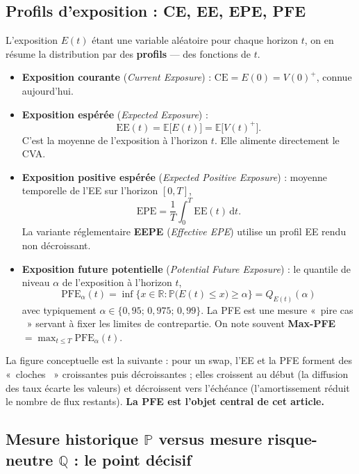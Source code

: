 \documentclass[11pt,a4paper]{article}
\providecommand{\og}{«~}
\providecommand{\fg}{~»}
\newcommand{\PFE}{\mathrm{PFE}}
\newcommand{\EE}{\mathrm{EE}}
\newcommand{\EPE}{\mathrm{EPE}}
\newcommand{\CE}{\mathrm{CE}}
\newcommand{\Prob}{\mathbb{P}}
\newcommand{\Qmeas}{\mathbb{Q}}
\newcommand{\E}{\mathbb{E}}
\newcommand{\R}{\mathbb{R}}
\newcommand{\dd}{\mathrm{d}}
\theoremstyle{remark}
\begin{document}
\subsection{Profils d'exposition : CE, EE, EPE, PFE}

L'exposition $E(t)$ étant une variable aléatoire pour chaque horizon $t$, on en résume la distribution par des \textbf{profils} --- des fonctions de $t$.
\begin{itemize}[nosep]
  \item \textbf{Exposition courante} (\emph{Current Exposure}) : $\CE = E(0) = V(0)^{+}$, connue aujourd'hui.
  \item \textbf{Exposition espérée} (\emph{Expected Exposure}) :
  \begin{equation}
  \EE(t) = \E\big[E(t)\big] = \E\big[V(t)^{+}\big].
  \end{equation}
  C'est la moyenne de l'exposition à l'horizon $t$. Elle alimente directement le CVA.
  \item \textbf{Exposition positive espérée} (\emph{Expected Positive Exposure}) : moyenne temporelle de l'EE sur l'horizon $[0,T]$,
  \begin{equation}
  \EPE = \frac{1}{T}\int_0^T \EE(t)\,\dd t.
  \end{equation}
  La variante réglementaire \textbf{EEPE} (\emph{Effective EPE}) utilise un profil EE rendu non décroissant.
  \item \textbf{Exposition future potentielle} (\emph{Potential Future Exposure}) : le quantile de niveau $\alpha$ de l'exposition à l'horizon $t$,
  \begin{equation}
  \boxed{\;\PFE_\alpha(t) = \inf\big\{x \in \R : \Prob\big(E(t) \le x\big) \ge \alpha \big\} = Q_{E(t)}(\alpha)\;}
  \end{equation}
  avec typiquement $\alpha \in \{0{,}95;\,0{,}975;\,0{,}99\}$. La PFE est une mesure \og pire cas \fg{} servant à fixer les limites de contrepartie. On note souvent \textbf{Max-PFE} $= \max_{t\le T}\PFE_\alpha(t)$.
\end{itemize}

La figure conceptuelle est la suivante : pour un swap, l'EE et la PFE forment des \og cloches \fg{} croissantes puis décroissantes ; elles croissent au début (la diffusion des taux écarte les valeurs) et décroissent vers l'échéance (l'amortissement réduit le nombre de flux restants). \textbf{La PFE est l'objet central de cet article.}

\subsection{Mesure historique $\Prob$ versus mesure risque-neutre $\Qmeas$ : le point décisif}
\label{sec:mesures}
\end{document}
